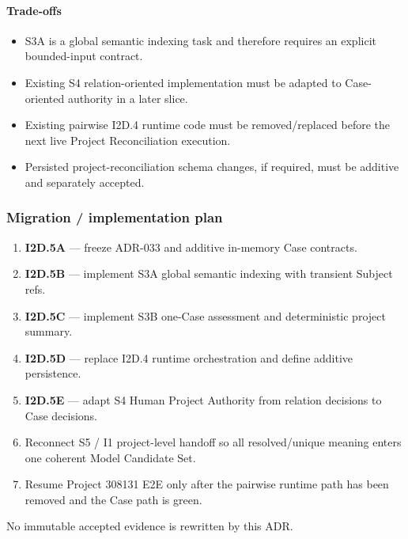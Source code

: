 \hypertarget{trade-offs-8}{%
\paragraph{Trade-offs}\label{trade-offs-8}}

\begin{itemize}
\tightlist
\item
  S3A is a global semantic indexing task and therefore requires an explicit bounded-input contract.
\item
  Existing S4 relation-oriented implementation must be adapted to Case-oriented authority in a later slice.
\item
  Existing pairwise I2D.4 runtime code must be removed/replaced before the next live Project Reconciliation execution.
\item
  Persisted project-reconciliation schema changes, if required, must be additive and separately accepted.
\end{itemize}

\hypertarget{migration--implementation-plan}{%
\subsubsection{Migration / implementation plan}\label{migration--implementation-plan}}

\begin{enumerate}
\def\labelenumi{\arabic{enumi}.}
\tightlist
\item
  \textbf{I2D.5A} --- freeze ADR-033 and additive in-memory Case contracts.
\item
  \textbf{I2D.5B} --- implement S3A global semantic indexing with transient Subject refs.
\item
  \textbf{I2D.5C} --- implement S3B one-Case assessment and deterministic project summary.
\item
  \textbf{I2D.5D} --- replace I2D.4 runtime orchestration and define additive persistence.
\item
  \textbf{I2D.5E} --- adapt S4 Human Project Authority from relation decisions to Case decisions.
\item
  Reconnect S5 / I1 project-level handoff so all resolved/unique meaning enters one coherent Model Candidate Set.
\item
  Resume Project 308131 E2E only after the pairwise runtime path has been removed and the Case path is green.
\end{enumerate}

No immutable accepted evidence is rewritten by this ADR.

